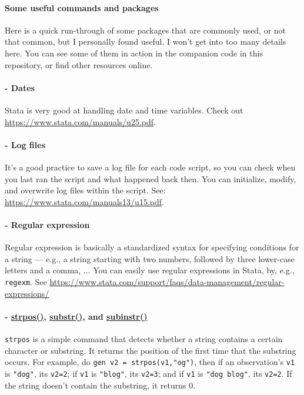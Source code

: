 \paragraph{Some useful commands and packages} Here is a quick run-through of some packages that are commonly used, or not that common, but I personally found useful. I won't get into too many details here. You can see some of them in action in the companion code in this repository, or find other resources online. 

\paragraph{- Dates} Stata is very good at handling date and time variables. Check out \url{https://www.stata.com/manuals/u25.pdf}. 

\paragraph{- Log files} It's a good practice to save a log file for each code script, so you can check when you last ran the script and what happened back then. You can initialize, modify, and overwrite log files within the script. See: \url{https://www.stata.com/manuals13/u15.pdf}.

\paragraph{- Regular expression} Regular expression is basically a standardized syntax for specifying conditions for a string --- e.g., a string starting with two numbers, followed by three lower-case letters and a comma, ... You can easily use regular expressions in Stata, by, e.g., \verb|regexm|. See \url{https://www.stata.com/support/faqs/data-management/regular-expressions/}

\paragraph{- \underline{strpos()}, \underline{substr()}, and \underline{subinstr()}} \verb|strpos| is a simple command that detects whether a string contains a certain character or substring. It returns the position of the first time that the substring occurs. For example, do \verb|gen v2 = strpos(v1,"og")|, then if an observation's \verb|v1| is \verb|"dog"|, its \verb|v2=2|; if \verb|v1| is \verb|"blog"|, its \verb|v2=3|; and if \verb|v1| is \verb|"dog blog"|, its \verb|v2=2|. If the string doesn't contain the substring, it returns 0. 

